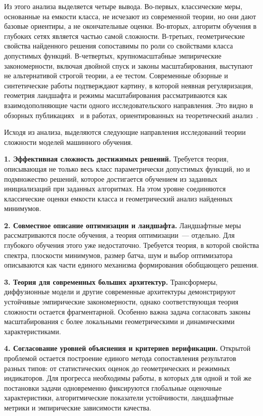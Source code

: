 Из этого анализа выделяется четыре вывода.
Во-первых, классические меры, основанные на емкости класса, не исчезают из современной теории, но они дают базовые ориентиры, а не окончательные оценки.
Во-вторых, алгоритм обучения в глубоких сетях является частью самой сложности.
В-третьих, геометрические свойства найденного решения сопоставимы по роли со свойствами класса допустимых функций.
В-четвертых, крупномасштабные эмпирические закономерности, включая двойной спуск и законы масштабирования, выступают не альтернативой строгой теории, а ее тестом.
Современные обзорные и синтетические работы подтверждают картину, в которой неявная регуляризация, геометрия ландшафта и режимы масштабирования рассматриваются как взаимодополняющие части одного исследовательского направления. Это видно в обзорных публикациях~\cite{hu2021complexitysurvey,recent2020theory,belkin2021overview} и в работах, ориентированных на теоретический анализ~\cite{explaining2021thesis,poggio2020theoretical,implicit2026synthesis}.

Исходя из анализа, выделяются следующие направления исследований теории сложности моделей машинного обучения.

\textbf{1. Эффективная сложность достижимых решений.}
Требуется теория, описывающая не только весь класс параметрически допустимых функций, но и подмножество решений, которое достигается обучением из заданных инициализаций при заданных алгоритмах.
На этом уровне соединяются классические оценки емкости класса и геометрический анализ найденных минимумов.

\textbf{2. Совместное описание оптимизации и ландшафта.}
Ландшафтные меры рассматриваются после обучения, а теория оптимизации~--- отдельно.
Для глубокого обучения этого уже недостаточно.
Требуется теория, в которой свойства спектра, плоскости минимумов, размер батча, шум и выбор оптимизатора описываются как части единого механизма формирования обобщающего решения.

\textbf{3. Теория для современных больших архитектур.}
Трансформеры, диффузионные модели и другие современные архитектуры демонстрируют устойчивые эмпирические закономерности, однако соответствующая теория сложности остается фрагментарной.
Особенно важна задача согласовать законы масштабирования с более локальными геометрическими и динамическими характеристиками.

\textbf{4. Согласование уровней объяснения и критериев верификации.}
Открытой проблемой остается построение единого метода сопоставления результатов разных типов: от статистических оценок до геометрических и режимных индикаторов.
Для прогресса необходимы работы, в которых для одной и той же постановки задачи одновременно фиксируются глобальные оценочные характеристики, алгоритмические показатели устойчивости, ландшафтные метрики и эмпирические зависимости качества.

